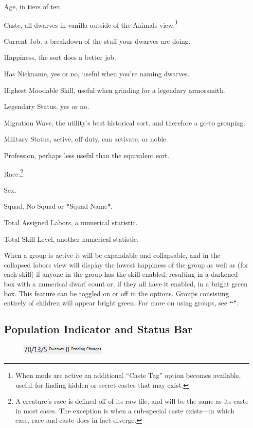 \documentclass[]{article}
\begin{document}
\noindent Age, in tiers of ten.

\noindent Caste, all dwarves in vanilla outside of the Animals view.\footnote{When mods are active an
additional ``Caste Tag'' option becomes available, useful for finding hidden or secret castes that may
exist.}

\noindent Current Job, a breakdown of the stuff your dwarves are doing.

\noindent Happiness, the sort does a better job.

\noindent Has Nickname, yes or no, useful when you're naming dwarves.

\noindent Highest Moodable Skill, useful when grinding for a legendary armorsmith.

\noindent Legendary Status, yes or no.

\noindent Migration Wave, the utility's best historical sort, and therefore
a go-to grouping.

\noindent Military Status, active, off duty, can activate, or noble.

\noindent Profession, perhaps less useful than the equivalent sort.

\noindent Race.\footnote{A creature's race is
defined off of its raw file, and will be the same as its caste in most cases. The exception is when a
sub-special caste exists---in which case, race and caste does in fact diverge.}

\noindent Sex.

\noindent Squad, No Squad or 
*Squad Name*.

\noindent Total Assigned Labors, a numerical statistic.

\noindent Total Skill Level, another numerical statistic.
\vspace{12pt}

When a group is active it will be expandable and collapsable, and in the collapsed labors view will
display the lowest happiness of the group as well as (for each skill) if anyone in the group has the
skill enabled, resulting in a darkened box with a numerical dwarf count or, if they all have it enabled,
in a bright green box. This feature can be toggled on or off in the options. Groups consisting entirely
of children will appear bright green. For more on using groups, see \textbf{``"}.

\subsection{Population Indicator and Status Bar}
\begin{figure}
\vspace{-20pt}
  \begin{center}
    \includegraphics[width=0.38\textwidth]{Sec1Fig12}
  \end{center}
\vspace{-20pt}
\end{figure}
\end{document}
